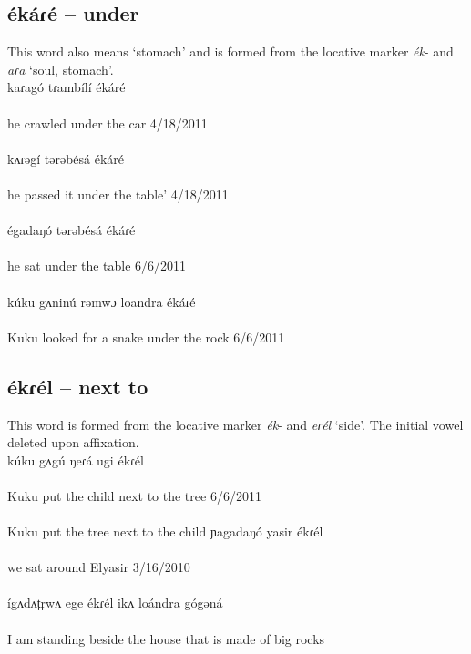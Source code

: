 \subsection{ékáɾé – under}
This word also means ‘stomach’ and is formed from the locative marker \textit{ék}- and \textit{aɾa} ‘soul, stomach’. 
\\
\gll kaɾagó tɾambílí ékáré\\
\\
\trans he crawled under the car		\hfill 4/18/2011\\
\\
\gll kʌɾəgí tərəbésá ékáré\\
\\
\trans he passed it under the table’	\hfill	4/18/2011\\
\\
\gll égadaŋó tərəbésá ékáɾé\\
\\
\trans he sat under the table		\hfill	6/6/2011\\
\\
\gll kúku gʌninú rəmwɔ loandra ékáɾé\\
\\
\trans Kuku looked for a snake under the rock	\hfill	6/6/2011\\

\subsection{ékɾél – next to} 
This word is formed from the locative marker \textit{ék}- and \textit{eɾél}  ‘side’. The initial vowel deleted upon affixation. 
\\
\gll kúku gʌgú ŋeɾá ugi ékɾél\\
\\
\trans Kuku put the child next to the tree	\hfill 6/6/2011\\
\\					Kuku put the tree next to the child
\gll ɲagadaŋó yasir ékɾél\\
\\
\trans we sat around Elyasir	\hfill 	3/16/2010\\
\\
\gll ígʌdʌt̪rwʌ ege ékɾél ikʌ loándra gógəná\\
\\
\trans I am standing beside the house that is made of big rocks\\


